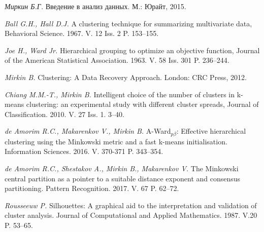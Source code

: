 \documentclass[12pt]{a&t}
\begin{document}
\begin{thebibliography}{10}


{\it Миркин Б.Г.}
Введение в анализ данных. М.: Юрайт, 2015.

{\it Ball G.H., Hall D.J.}
A clustering technique for summarizing multivariate data, Behavioral Science. 1967. V. 12 Iss. 2 P. 153--155.

{\it Joe H., Ward Jr.}
Hierarchical grouping to optimize an objective function, Journal of the American Statistical Association. 1963. V. 58 Iss. 301 P. 236--244.

{\it Mirkin B.}
Clustering: A Data Recovery Approach. London: CRC Press, 2012.

{\it Chiang M.M.-T., Mirkin B.}
Intelligent choice of the number of clusters in k-means clustering: an experimental study with different cluster spreads, Journal of Classification. 2010. V. 27 Iss. 1. 3--40.

{\it de Amorim R.C., Makarenkov V., Mirkin B.}
\mbox{A-Ward$ _{p\beta} $}: Effective hierarchical clustering using the Minkowski metric and a fast \mbox{k-means} initialisation. Information Sciences. 2016. V. 370-371 P. 343--354.

{\it de Amorim R.C., Shestakov A., Mirkin B., Makarenkov V.}
The Minkowski central partition as a pointer to a suitable distance exponent and consensus partitioning. Pattern Recognition. 2017. V. 67 P. 62--72.

{\it Rousseeuw P.}
Silhouettes: A graphical aid to the interpretation and validation of cluster analysis. Journal of Computational and Applied Mathematics. 1987. V.20 P. 53--65.

\end{thebibliography}


\end{document}
